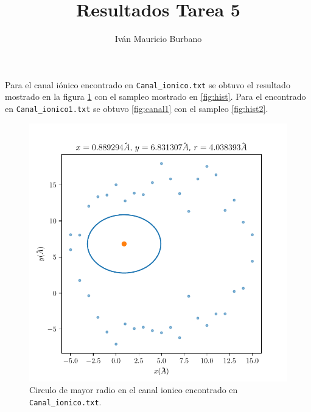 \documentclass[a4paper]{article}
\title{Resultados Tarea 5}
\author{Iv\'an Mauricio Burbano}
\begin{document}
	\maketitle

	Para el canal i\'onico encontrado en \texttt{Canal\_ionico.txt} se obtuvo el resultado mostrado en la figura \ref{fig:canal} con el sampleo mostrado en \ref{fig:hist}. Para el encontrado en \texttt{Canal\_ionico1.txt} se obtuvo \ref{fig:canal1} con el sampleo \ref{fig:hist2}.

	\begin{figure}
		\includegraphics{canal_ionico_1.pdf}
		\caption{Circulo de mayor radio en el canal ionico encontrado en \texttt{Canal\_ionico.txt}.}
		\label{fig:canal}
	\end{figure}
\end{document}
